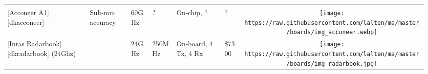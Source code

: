 \begin{longtable}[]{@{}llllllc@{}}
\begin{minipage}[t]{0.10\columnwidth}
\end{minipage}\tabularnewline
\begin{minipage}[t]{0.09\columnwidth}\raggedright\strut
{[}Acconeer A1{]}{[}dkacconeer{]}\strut
\end{minipage} & \begin{minipage}[t]{0.13\columnwidth}\raggedright\strut
Sub-mm accuracy\strut
\end{minipage} & \begin{minipage}[t]{0.09\columnwidth}\raggedright\strut
60GHz\strut
\end{minipage} & \begin{minipage}[t]{0.11\columnwidth}\raggedright\strut
?\strut
\end{minipage} & \begin{minipage}[t]{0.10\columnwidth}\raggedright\strut
On-chip, ?\strut
\end{minipage} & \begin{minipage}[t]{0.15\columnwidth}\raggedright\strut
?\strut
\end{minipage} & \begin{minipage}[t]{0.10\columnwidth}\centering\strut
\texttt{[image: https://raw.githubusercontent.com/lalten/ma/master/boards/img\_acconeer.webp]}\strut
\end{minipage}\tabularnewline
\begin{minipage}[t]{0.09\columnwidth}\raggedright\strut
{[}Inras Radarbook{]}{[}dkradarbook{]} (24Ghz)\strut
\end{minipage} & \begin{minipage}[t]{0.13\columnwidth}\raggedright\strut
\strut
\end{minipage} & \begin{minipage}[t]{0.09\columnwidth}\raggedright\strut
24GHz\strut
\end{minipage} & \begin{minipage}[t]{0.11\columnwidth}\raggedright\strut
250MHz\strut
\end{minipage} & \begin{minipage}[t]{0.10\columnwidth}\raggedright\strut
On-board, 4 Tx, 4 Rx\strut
\end{minipage} & \begin{minipage}[t]{0.15\columnwidth}\raggedright\strut
\$7300\strut
\end{minipage} & \begin{minipage}[t]{0.10\columnwidth}\centering\strut
\texttt{[image: https://raw.githubusercontent.com/lalten/ma/master/boards/img\_radarbook.jpg]}\strut
\end{minipage}\tabularnewline

\end{longtable}
